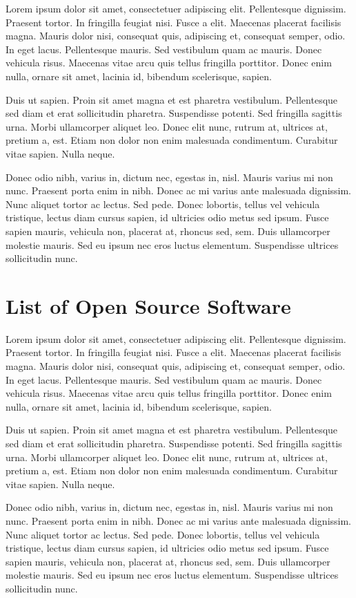 \documentclass[11pt,letterpaper,onecolumn,twoside,openright,draft]{report}
\begin{document}
Lorem ipsum dolor sit amet, consectetuer adipiscing elit. Pellentesque dignissim.
Praesent tortor.
In fringilla feugiat nisi.
Fusce a elit.
Maecenas placerat facilisis magna.
Mauris dolor nisi, consequat quis, adipiscing et, consequat semper, odio.
In eget lacus.
Pellentesque mauris.
Sed vestibulum quam ac mauris.
Donec vehicula risus.
Maecenas vitae arcu quis tellus fringilla porttitor.
Donec enim nulla, ornare sit amet, lacinia id, bibendum scelerisque, sapien.

Duis ut sapien.
Proin sit amet magna et est pharetra vestibulum.
Pellentesque sed diam et erat sollicitudin pharetra.
Suspendisse potenti.
Sed fringilla sagittis urna.
Morbi ullamcorper aliquet leo.
Donec elit nunc, rutrum at, ultrices at, pretium a, est.
Etiam non dolor non enim malesuada condimentum.
Curabitur vitae sapien.
Nulla neque.

Donec odio nibh, varius in, dictum nec, egestas in, nisl.
Mauris varius mi non nunc.
Praesent porta enim in nibh.
Donec ac mi varius ante malesuada dignissim.
Nunc aliquet tortor ac lectus.
Sed pede.
Donec lobortis, tellus vel vehicula tristique, lectus diam cursus sapien, id ultricies odio metus sed ipsum.
Fusce sapien mauris, vehicula non, placerat at, rhoncus sed, sem.
Duis ullamcorper molestie mauris.
Sed eu ipsum nec eros luctus elementum.
Suspendisse ultrices sollicitudin nunc.


\chapter{List of Open Source Software}
Lorem ipsum dolor sit amet, consectetuer adipiscing elit. Pellentesque dignissim.
Praesent tortor.
In fringilla feugiat nisi.
Fusce a elit.
Maecenas placerat facilisis magna.
Mauris dolor nisi, consequat quis, adipiscing et, consequat semper, odio.
In eget lacus.
Pellentesque mauris.
Sed vestibulum quam ac mauris.
Donec vehicula risus.
Maecenas vitae arcu quis tellus fringilla porttitor.
Donec enim nulla, ornare sit amet, lacinia id, bibendum scelerisque, sapien.

Duis ut sapien.
Proin sit amet magna et est pharetra vestibulum.
Pellentesque sed diam et erat sollicitudin pharetra.
Suspendisse potenti.
Sed fringilla sagittis urna.
Morbi ullamcorper aliquet leo.
Donec elit nunc, rutrum at, ultrices at, pretium a, est.
Etiam non dolor non enim malesuada condimentum.
Curabitur vitae sapien.
Nulla neque.

Donec odio nibh, varius in, dictum nec, egestas in, nisl.
Mauris varius mi non nunc.
Praesent porta enim in nibh.
Donec ac mi varius ante malesuada dignissim.
Nunc aliquet tortor ac lectus.
Sed pede.
Donec lobortis, tellus vel vehicula tristique, lectus diam cursus sapien, id ultricies odio metus sed ipsum.
Fusce sapien mauris, vehicula non, placerat at, rhoncus sed, sem.
Duis ullamcorper molestie mauris.
Sed eu ipsum nec eros luctus elementum.
Suspendisse ultrices sollicitudin nunc.
\end{document}

